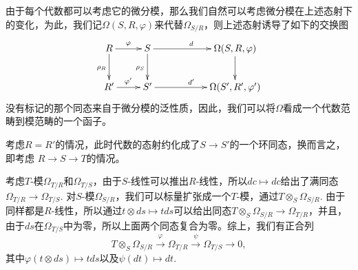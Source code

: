 由于每个代数都可以考虑它的微分模，那么我们自然可以考虑微分模在上述态射下的变化，为此，我们记$\Omega(S,R,\varphi)$来代替$\Omega_{S/R}$，则上述态射诱导了如下的交换图
\[
\begin{xy}
	\xymatrix
	{
		R\ar[r]^{\varphi}\ar[d]_{\rho_R}&S\ar[rr]^{d} \ar[d]_{\rho_S}&&\Omega(S,R,\varphi) \ar[d]\\
		R'\ar[r]^{\varphi'}&S'\ar[rr]^{d'}&&\Omega(S',R',\varphi')
	}
\end{xy}
\]
没有标记的那个同态来自于微分模的泛性质，因此，我们可以将$\Omega$看成一个代数范畴到模范畴的一个函子。

\para 考虑$R=R'$的情况，此时代数的态射约化成了$S\to S'$的一个环同态，换而言之，即考虑
$R\to S\to T$的情况。

考虑$T$-模$\Omega_{T/R}$和$\Omega_{T/S}$，由于$S$-线性可以推出$R$-线性，所以$dc\mapsto dc$给出了满同态$\Omega_{T/R}\to\Omega_{T/S}$. 对$S$-模$\Omega_{S/R}$，我们可以标量扩张成一个$T$-模，通过$T\otimes_S \Omega_{S/R}$. 由于同样都是$R$-线性，所以通过$t\otimes ds\mapsto tds$可以给出同态$T\otimes_S \Omega_{S/R}\to \Omega_{T/R}$，并且，由于$ds$在$\Omega_{T/S}$中为零，所以上面两个同态复合为零。综上，我们有正合列
\[
	T\otimes_S \Omega_{S/R}\xrightarrow{\varphi} \Omega_{T/R}\xrightarrow{\psi} \Omega_{T/S}\to 0,
\]
其中$\varphi(t\otimes ds)\mapsto tds$以及$\psi(dt)\mapsto dt$.